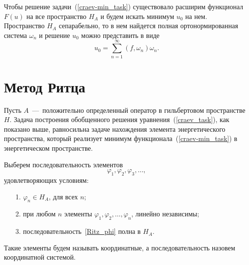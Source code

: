 \documentclass[12pt, a4paper]{article}
\begin{document}
Чтобы решение задачи~(\ref{craev-min_task}) существовало расширим функционал $F(u)$ на все пространство $H_A$ и будем искать минимум $u_0$ на нем.
Пространство $H_A$ сепарабельно, то в нем найдется полная ортонормированная система $\omega_n$ и решение $u_0$ можно представить в виде
\begin{equation}
	\label{craev_ser}
	u_0 = \sum\limits_{n = 1}^{\infty} (f, \omega_n)\omega_n.
\end{equation}

\section{Метод Ритца}
Пусть $A$~---~положительно определенный оператор в гильбертовом  пространстве $H$. Задача построения обобщенного решения уравнения~(\ref{craev_task}),
как показано выше, равносильна задаче нахождения элемента энергетического
пространства, который реализует минимум функционала~(\ref{craev-min_task})
в энергетическом пространстве.

Выберем последовательность элементов
\begin{equation}\label{Ritz_phi}
	\varphi_1, \varphi_2, \varphi_3, \ldots,
\end{equation}
удовлетворяющих условиям:
\begin{itemize}
	\item [1.] $\varphi_n \in H_A$, для всех $n$;
	\item [2.] при любом $n$ элементы $\varphi_1, \varphi_2,  \ldots, \varphi_n$, линейно независимы;
	\item [3.] последовательность~\eqref{Ritz_phi} полна в $H_A$.
\end{itemize}
Такие элементы будем называть координатные, а последовательность назовем координатной системой.
\end{document}
